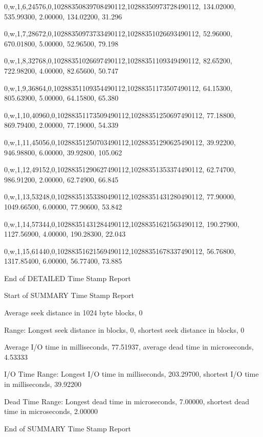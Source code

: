 0,w,1,6,24576,0,10288350839708490112,10288350973728490112, 134.02000, 535.99300, 2.00000, 134.02200, 31.296

0,w,1,7,28672,0,10288350973733490112,10288351026693490112, 52.96000, 670.01800, 5.00000, 52.96500, 79.198

0,w,1,8,32768,0,10288351026697490112,10288351109349490112, 82.65200, 722.98200, 4.00000, 82.65600, 50.747

0,w,1,9,36864,0,10288351109354490112,10288351173507490112, 64.15300, 805.63900, 5.00000, 64.15800, 65.380

0,w,1,10,40960,0,10288351173509490112,10288351250697490112, 77.18800, 869.79400, 2.00000, 77.19000, 54.339

0,w,1,11,45056,0,10288351250703490112,10288351290625490112, 39.92200, 946.98800, 6.00000, 39.92800, 105.062

0,w,1,12,49152,0,10288351290627490112,10288351353374490112, 62.74700, 986.91200, 2.00000, 62.74900, 66.845

0,w,1,13,53248,0,10288351353380490112,10288351431280490112, 77.90000, 1049.66500, 6.00000, 77.90600, 53.842

0,w,1,14,57344,0,10288351431284490112,10288351621563490112, 190.27900, 1127.56900, 4.00000, 190.28300, 22.043

0,w,1,15,61440,0,10288351621569490112,10288351678337490112, 56.76800, 1317.85400, 6.00000, 56.77400, 73.885

End of DETAILED Time Stamp Report

Start of SUMMARY Time Stamp Report

Average seek distance in 1024 byte blocks, 0

Range: Longest seek distance in blocks, 0, shortest seek distance in blocks, 0

Average I/O time in milliseconds, 77.51937, average dead time in microseconds, 4.53333

I/O Time Range: Longest I/O time in milliseconds, 203.29700, shortest I/O time in milliseconds, 39.92200

Dead Time Range: Longest dead time in microseconds, 7.00000, shortest dead time in microseconds, 2.00000

End of SUMMARY Time Stamp Report

